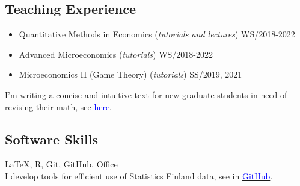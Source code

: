 \documentclass[16pt]{article}
\begin{document}
\subsection*{Teaching Experience}
\begin{itemize} \setlength\itemsep{0.01em}
                          \item Quantitative Methods in Economics (\textit{tutorials and lectures}) WS/2018-2022  
                          \item Advanced Microeconomics (\textit{tutorials}) WS/2018-2022 
                          \item Microeconomics II (Game Theory) (\textit{tutorials}) SS/2019, 2021 
\end{itemize}

\noindent I'm writing a concise and intuitive text for new graduate students in need of revising their math, see \href{https://cloud.uni-konstanz.de/index.php/s/nSm3TmENpPX3q6C}{\textcolor{blue}{here}}.

\subsection*{Software Skills}

\LaTeX, R, Git, GitHub, Office \\

\noindent I develop tools for efficient use of Statistics Finland data, see in \href{https://github.com/jalasalmi}{\textcolor{blue}{GitHub}}.
\end{document}
